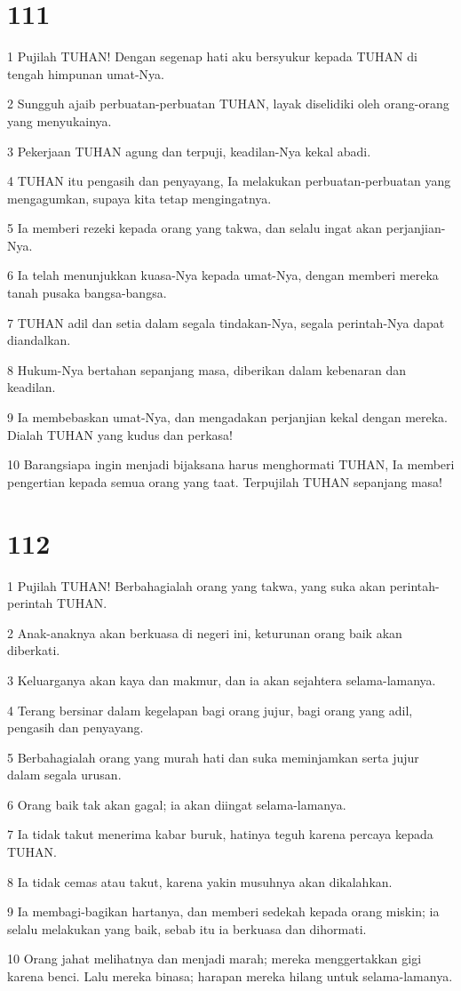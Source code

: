 \chapter{111}

\par 1 Pujilah TUHAN! Dengan segenap hati aku bersyukur kepada TUHAN di tengah himpunan umat-Nya.
\par 2 Sungguh ajaib perbuatan-perbuatan TUHAN, layak diselidiki oleh orang-orang yang menyukainya.
\par 3 Pekerjaan TUHAN agung dan terpuji, keadilan-Nya kekal abadi.
\par 4 TUHAN itu pengasih dan penyayang, Ia melakukan perbuatan-perbuatan yang mengagumkan, supaya kita tetap mengingatnya.
\par 5 Ia memberi rezeki kepada orang yang takwa, dan selalu ingat akan perjanjian-Nya.
\par 6 Ia telah menunjukkan kuasa-Nya kepada umat-Nya, dengan memberi mereka tanah pusaka bangsa-bangsa.
\par 7 TUHAN adil dan setia dalam segala tindakan-Nya, segala perintah-Nya dapat diandalkan.
\par 8 Hukum-Nya bertahan sepanjang masa, diberikan dalam kebenaran dan keadilan.
\par 9 Ia membebaskan umat-Nya, dan mengadakan perjanjian kekal dengan mereka. Dialah TUHAN yang kudus dan perkasa!
\par 10 Barangsiapa ingin menjadi bijaksana harus menghormati TUHAN, Ia memberi pengertian kepada semua orang yang taat. Terpujilah TUHAN sepanjang masa!

\chapter{112}

\par 1 Pujilah TUHAN! Berbahagialah orang yang takwa, yang suka akan perintah-perintah TUHAN.
\par 2 Anak-anaknya akan berkuasa di negeri ini, keturunan orang baik akan diberkati.
\par 3 Keluarganya akan kaya dan makmur, dan ia akan sejahtera selama-lamanya.
\par 4 Terang bersinar dalam kegelapan bagi orang jujur, bagi orang yang adil, pengasih dan penyayang.
\par 5 Berbahagialah orang yang murah hati dan suka meminjamkan serta jujur dalam segala urusan.
\par 6 Orang baik tak akan gagal; ia akan diingat selama-lamanya.
\par 7 Ia tidak takut menerima kabar buruk, hatinya teguh karena percaya kepada TUHAN.
\par 8 Ia tidak cemas atau takut, karena yakin musuhnya akan dikalahkan.
\par 9 Ia membagi-bagikan hartanya, dan memberi sedekah kepada orang miskin; ia selalu melakukan yang baik, sebab itu ia berkuasa dan dihormati.
\par 10 Orang jahat melihatnya dan menjadi marah; mereka menggertakkan gigi karena benci. Lalu mereka binasa; harapan mereka hilang untuk selama-lamanya.

